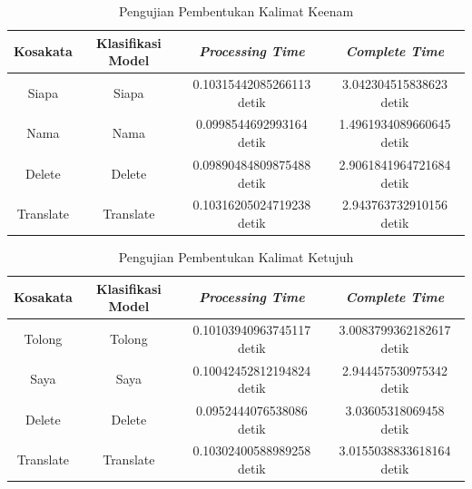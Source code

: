 \begin{longtable}{|c|c|c|c|}
  \caption{Pengujian Pembentukan Kalimat Keenam}
  \label{tb:prediksikombinasi6}                                   \\
  \hline
  \rowcolor[HTML]{C0C0C0}
  \textbf{Kosakata} & \textbf{Klasifikasi Model} & \textbf{\emph{Processing Time}} & \textbf{\emph{Complete Time}}\\
  \hline
  Siapa               & Siapa                         & 0.10315442085266113 detik                           & 3.042304515838623 detik                                 \\
  Nama                & Nama                          & 0.0998544692993164  detik                           & 1.4961934089660645 detik                                  \\
  Delete              & Delete                        & 0.09890484809875488 detik                           & 2.9061841964721684 detik                                  \\
  Translate           & Translate                     & 0.10316205024719238 detik                           & 2.943763732910156 detik                                 \\
  \hline
\end{longtable}

\begin{longtable}{|c|c|c|c|}
  \caption{Pengujian Pembentukan Kalimat Ketujuh}
  \label{tb:prediksikombinasi7}                                   \\
  \hline
  \rowcolor[HTML]{C0C0C0}
  \textbf{Kosakata} & \textbf{Klasifikasi Model} & \textbf{\emph{Processing Time}} & \textbf{\emph{Complete Time}}\\
  \hline
  Tolong              & Tolong                        & 0.10103940963745117 detik                          & 3.0083799362182617 detik                                  \\
  Saya                & Saya                          & 0.10042452812194824 detik                          & 2.944457530975342 detik                                 \\
  Delete              & Delete                        & 0.0952444076538086 detik                           & 3.03605318069458  detik                                \\
  Translate           & Translate                     & 0.10302400588989258 detik                          & 3.0155038833618164 detik                                  \\
  \hline
\end{longtable}

